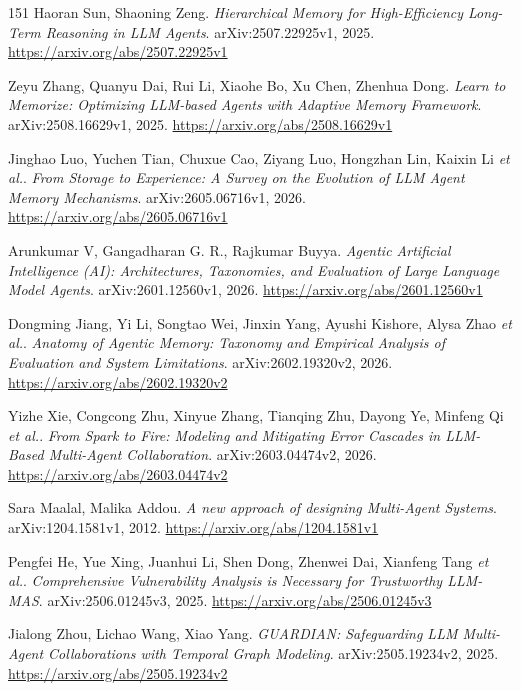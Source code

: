 \documentclass[11pt,a4paper]{article}
\begin{document}
\begin{thebibliography}{151}
Haoran Sun, Shaoning Zeng.
\newblock \emph{Hierarchical Memory for High-Efficiency Long-Term Reasoning in LLM Agents}.
\newblock arXiv:2507.22925v1, 2025.
\newblock \url{https://arxiv.org/abs/2507.22925v1}

Zeyu Zhang, Quanyu Dai, Rui Li, Xiaohe Bo, Xu Chen, Zhenhua Dong.
\newblock \emph{Learn to Memorize: Optimizing LLM-based Agents with Adaptive Memory Framework}.
\newblock arXiv:2508.16629v1, 2025.
\newblock \url{https://arxiv.org/abs/2508.16629v1}

Jinghao Luo, Yuchen Tian, Chuxue Cao, Ziyang Luo, Hongzhan Lin, Kaixin Li \emph{et al.}.
\newblock \emph{From Storage to Experience: A Survey on the Evolution of LLM Agent Memory Mechanisms}.
\newblock arXiv:2605.06716v1, 2026.
\newblock \url{https://arxiv.org/abs/2605.06716v1}

Arunkumar V, Gangadharan G. R., Rajkumar Buyya.
\newblock \emph{Agentic Artificial Intelligence (AI): Architectures, Taxonomies, and Evaluation of Large Language Model Agents}.
\newblock arXiv:2601.12560v1, 2026.
\newblock \url{https://arxiv.org/abs/2601.12560v1}

Dongming Jiang, Yi Li, Songtao Wei, Jinxin Yang, Ayushi Kishore, Alysa Zhao \emph{et al.}.
\newblock \emph{Anatomy of Agentic Memory: Taxonomy and Empirical Analysis of Evaluation and System Limitations}.
\newblock arXiv:2602.19320v2, 2026.
\newblock \url{https://arxiv.org/abs/2602.19320v2}

Yizhe Xie, Congcong Zhu, Xinyue Zhang, Tianqing Zhu, Dayong Ye, Minfeng Qi \emph{et al.}.
\newblock \emph{From Spark to Fire: Modeling and Mitigating Error Cascades in LLM-Based Multi-Agent Collaboration}.
\newblock arXiv:2603.04474v2, 2026.
\newblock \url{https://arxiv.org/abs/2603.04474v2}

Sara Maalal, Malika Addou.
\newblock \emph{A new approach of designing Multi-Agent Systems}.
\newblock arXiv:1204.1581v1, 2012.
\newblock \url{https://arxiv.org/abs/1204.1581v1}

Pengfei He, Yue Xing, Juanhui Li, Shen Dong, Zhenwei Dai, Xianfeng Tang \emph{et al.}.
\newblock \emph{Comprehensive Vulnerability Analysis is Necessary for Trustworthy LLM-MAS}.
\newblock arXiv:2506.01245v3, 2025.
\newblock \url{https://arxiv.org/abs/2506.01245v3}

Jialong Zhou, Lichao Wang, Xiao Yang.
\newblock \emph{GUARDIAN: Safeguarding LLM Multi-Agent Collaborations with Temporal Graph Modeling}.
\newblock arXiv:2505.19234v2, 2025.
\newblock \url{https://arxiv.org/abs/2505.19234v2}


\end{thebibliography}
\end{document}
